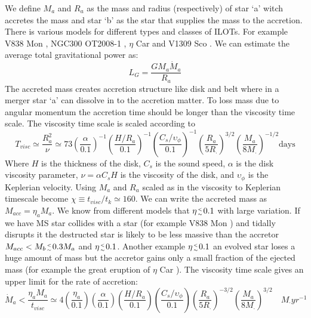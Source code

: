 \documentclass[a4paper,12pt,modern]{aastex62}
\newcommand{\lesim}{\genfrac{}{}{0pt}{2}{<}{\sim}}
\begin{document}
We define $M_a$ and $R_a$ as the mass and radius (respectively) of star `a’ witch accretes the mass and star `b’ as the star that supplies the mass to the accretion. There is various models for different types and classes of ILOTs. For example V838 Mon \cite{2006A&A...451..223T}, NGC300 OT2008-1 \cite{2010ApJ...709L..11K}, $\eta$ Car \cite{2016ApJ...817...66K} and V1309 Sco \cite{2011A&A...528A.114T}.
We can estimate the average total gravitational power as:
\begin{equation} 
L_G=\frac{ G M_a \dot M_a }{R_a}
\end{equation}
The accreted mass creates accretion structure like disk and belt where in a merger star `a’ can dissolve in to the accretion matter. To loss mass due to angular momentum the accretion time should be longer than the viscosity time scale.
The viscosity time scale is scaled according to
\begin{equation} 
T_{visc}\simeq \frac{R^2_a}{\nu} \simeq 73 \left(\frac{\alpha}{0.1}\right)^{-1} \left(\frac{H/R_a}{0.1}\right)^{-1} \left(\frac{C_s/\upsilon_\phi}{0.1}\right) ^{-1} \left(\frac{R_a}{5R_\cdot}\right)^{3/2} \left(\frac{M_a}{8M_\cdot}\right)^{-1/2} \text{days}
\end{equation}
Where $H$ is the thickness of the disk, $C_s$ is the sound speed, $\alpha$ is the disk viscosity parameter, $\nu=\alpha C_s H$ is the viscosity of the disk, and $\upsilon_\phi$ is the Keplerian velocity.  Using $M_a$ and $R_a$ scaled as in \cite{2005A&A...441.1099T} the viscosity to Keplerian timescale become $\chi \equiv t_{visc}/t_k\simeq 160$. We can write the accreted mass as $M_{acc}=\eta_a M_a$. We know from different models that $\eta \lesim 0.1$ with large variation. If we have MS star collides with a star (for example V838 Mon \cite{2006A&A...451..223T}) and tidally disrupts it the destructed star is likely to be less massive than the accretor $M_{acc} < M_b \lesim 0.3M_a$ and $\eta\lesim 0.1$. Another example $\eta\lesim 0.1$ an evolved star loses a huge amount of mass but the accretor gains only a small fraction of the ejected mass (for example the great eruption of $\eta$ Car \cite{2008NewA...13..569K}). 
The viscosity time scale gives an upper limit for the rate of accretion:
\begin{equation}
\dot M_a < \frac{\eta_a M_a}{t_{visc}} \simeq 4\left(\frac{\eta_a}{0.1}\right) \left(\frac{\alpha}{0.1}\right) \left(\frac{H/R_a}{0.1}\right) \left(\frac{C_s/\upsilon_\phi}{0.1}\right) \left(\frac{R_a}{5R_\cdot}\right)^{-3/2} \left(\frac{M_a}{8M_\cdot}\right)^{3/2} \quad M_\cdot yr^{-1}
\end{equation}
\end{document}
